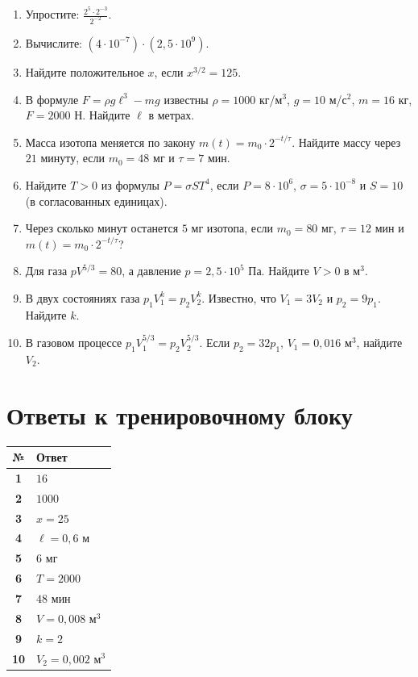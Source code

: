 \documentclass[a4paper,12pt]{article}
\newcommand{\sect}[1]{\section{#1}\vspace{-0.35em}\noindent{\color{accent}\rule{\linewidth}{0.45pt}}\vspace{0.25em}}
\begin{document}
\begin{enumerate}[label=\textbf{\arabic*.}]
\item Упростите: $\displaystyle \frac{2^5\cdot2^{-3}}{2^{-2}}$.
\item Вычислите: $\displaystyle (4\cdot10^{-7})\cdot(2{,}5\cdot10^9)$.
\item Найдите положительное $x$, если $\displaystyle x^{3/2}=125$.
\item В формуле $F=\rho g\ell^3-mg$ известны $\rho=1000$ кг/м$^3$, $g=10$ м/с$^2$, $m=16$ кг, $F=2000$ Н. Найдите $\ell$ в метрах.
\item Масса изотопа меняется по закону $m(t)=m_0\cdot2^{-t/\tau}$. Найдите массу через $21$ минуту, если $m_0=48$ мг и $\tau=7$ мин.
\item Найдите $T>0$ из формулы $P=\sigma ST^4$, если $P=8\cdot10^6$, $\sigma=5\cdot10^{-8}$ и $S=10$ (в согласованных единицах).
\item Через сколько минут останется $5$ мг изотопа, если $m_0=80$ мг, $\tau=12$ мин и $m(t)=m_0\cdot2^{-t/\tau}$?
\item Для газа $pV^{5/3}=80$, а давление $p=2{,}5\cdot10^5$ Па. Найдите $V>0$ в м$^3$.
\item В двух состояниях газа $p_1V_1^k=p_2V_2^k$. Известно, что $V_1=3V_2$ и $p_2=9p_1$. Найдите $k$.
\item В газовом процессе $p_1V_1^{5/3}=p_2V_2^{5/3}$. Если $p_2=32p_1$, $V_1=0{,}016$ м$^3$, найдите $V_2$.
\end{enumerate}

\clearpage
\sect{Ответы к тренировочному блоку}
\begin{center}
\begin{tabularx}{0.88\linewidth}{@{}>{\bfseries}cX@{}}
\toprule
№ & Ответ \\
\midrule
1 & $16$ \\
2 & $1000$ \\
3 & $x=25$ \\
4 & $\ell=0{,}6$ м \\
5 & $6$ мг \\
6 & $T=2000$ \\
7 & $48$ мин \\
8 & $V=0{,}008$ м$^3$ \\
9 & $k=2$ \\
10 & $V_2=0{,}002$ м$^3$ \\
\bottomrule
\end{tabularx}
\end{center}
\end{document}

